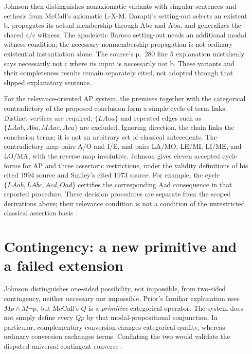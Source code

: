 Johnson then distinguishes nonaxiomatic variants with singular sentences and
ecthesis from McCall's axiomatic L-X-M. Darapti's setting-out selects an
existent b, propagates its actual membership through Abc and Aba, and
generalizes the shared a/c witness. The apodeictic Baroco setting-out needs
an additional modal witness condition; the necessary nonmembership propagation
is not ordinary existential instantiation alone. The source's p.~280 line 5
explanation mistakenly says necessarily not c where its input is necessarily
not b. These variants and their completeness results remain separately cited,
not adopted through that slipped explanatory sentence.

For the relevance-oriented AP system, the premises together with the
categorical contradictory of the proposed conclusion form a simple cycle of
term links. Distinct vertices are required; \(\{LAaa\}\) and repeated
edges such as \(\{LAab,Aba,MAac,Aca\}\) are excluded. Ignoring direction,
the chain links the conclusion terms; it is not an arbitrary set of classical
antecedents. The contradictory map pairs A/O and I/E, and pairs LA/MO,
LE/MI, LI/ME, and LO/MA, with the reverse map involutive.
Johnson gives eleven accepted cycle forms for AP and three assertoric
restrictions, under the validity definitions of his cited 1994 source and
Smiley's cited 1973 source. For example, the cycle
\(\{LAab,LAbc,Acd,Oad\}\) certifies the corresponding Aad consequence
in that reported procedure. These decision procedures are separate from
the scoped derivations above; their relevance condition is not a condition
of the unrestricted classical assertion basis
\parencite[pp.~279--284]{Johnson2004ModalSyllogisms}.

\section{Contingency: a new primitive and a failed extension}
\label{sec:p13-johnson-mccall-contingency}

Johnson distinguishes one-sided possibility, not impossible, from two-sided
contingency, neither necessary nor impossible. Prior's familiar explanation
uses \(Mp\land M\neg p\), but McCall's \(Q\) is a \emph{primitive}
categorical operator. The system does not simply define every \(Qp\) by that
modal-propositional conjunction. In particular, complementary conversion
changes categorical quality, whereas ordinary conversion exchanges terms.
Conflating the two would validate the disputed universal contingent converse
\parencite[pp.~283--286]{Johnson2004ModalSyllogisms}.

